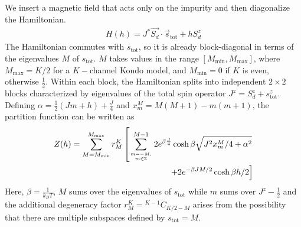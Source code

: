 \documentclass[reprint,prb,superscriptaddress]{revtex4-2}
\begin{document}
We insert a magnetic field that acts only on the impurity and then diagonalize the Hamiltonian.
\begin{align}
	\label{stargraph_field_hamiltonian}
	H(h) = J^* \vec{S_d}\cdot\vec{s}_\text{tot} + h S_d^z
\end{align}
The Hamiltonian commutes with \(s_\text{tot}\), so it is already block-diagonal in terms of the eigenvalues \(M\) of \(s_\text{tot}\). \(M\) takes values in the range \(\left[M_\text{min}, M_\text{max}\right]\), where \(M_\text{max} = K/2\) for a \(K-\)channel Kondo model, and \(M_\text{min} = 0\)  if \(K\) is even, otherwise \(\frac{1}{2}\). Within each block, the Hamiltonian splits into independent \(2\times 2\) blocks characterized by eigenvalues of the total spin operator \(J^z = S_d^z + s^z_\text{tot}\). Defining \(\alpha = \frac{1}{2}\left(Jm + h\right) + \frac{J}{4}\) and \(x^M_m = M(M+1) - m(m+1)\), the partition function can be written as
\begin{align}
	Z(h) =\sum_{M=M_\text{min}}^{M_\text{max}}r^K_M\left[\sum_{m=-M, \atop{m\in \mathbb{Z}}}^{M-1}2e^{\beta \frac{J}{4}}\cosh \beta\sqrt{J^2x^M_m/4 + \alpha^2} \right.\nonumber\\
\left.+ 2e^{-\beta JM/2}\cosh \beta h/2\right]
\end{align}
Here, \(\beta = \frac{1}{k_B T}\), \(M\) sums over the eigenvalues of \(s_\text{tot}\) while \(m\) sums over \(J^z - \frac{1}{2}\) and the additional degeneracy factor \(r^K_M= {}^{K-1}C_{K/2 - M}\) arises from the possibility that there are multiple subspaces defined by \(s_\text{tot}=M\). 
\end{document}
